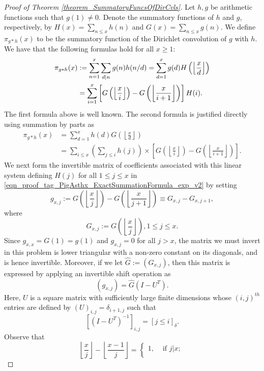 \documentclass[11pt,reqno,a4letter]{article}
\numberwithin{figure}{section}
\numberwithin{table}{section}
\newcommand{\Iverson}[1]{\ensuremath{\left[#1\right]_{\delta}}}
\newcommand{\floor}[1]{\left\lfloor #1 \right\rfloor}
\newcommand{\Floor}[2]{\ensuremath{\left\lfloor \frac{#1}{#2} \right\rfloor}}
\theoremstyle{plain}
\numberwithin{theorem}{section}
\theoremstyle{definition}
\begin{document}
\begin{proof}[Proof of Theorem \ref{theorem_SummatoryFuncsOfDirCvls}] 
\label{proofOf_theorem_SummatoryFuncsOfDirCvls} 
Let $h,g$ be arithmetic functions such that $g(1) \neq 0$. 
Denote the summatory functions of $h$ and $g$, 
respectively, by $H(x) = \sum_{n \leq x} h(n)$ and $G(x) = \sum_{n \leq x} g(n)$. 
We define $\pi_{g \ast h}(x)$ to be the summatory function of the 
Dirichlet convolution of $g$ with $h$. 
We have that the following formulas hold for all $x \geq 1$: 
\begin{align} 
\notag 
\pi_{g \ast h}(x) & := \sum_{n=1}^{x} \sum_{d|n} g(n) h(n/d) = \sum_{d=1}^x g(d) H\left(\floor{\frac{x}{d}}\right) \\ 
\label{eqn_proof_tag_PigAsthx_ExactSummationFormula_exp_v2} 
     & = \sum_{i=1}^x \left[G\left(\floor{\frac{x}{i}}\right) - G\left(\floor{\frac{x}{i+1}}\right)\right] H(i). 
\end{align} 
The first formula above is well known. The second formula is justified directly using 
summation by parts as \cite[\S 2.10(ii)]{NISTHB} 
\begin{align*} 
\pi_{g \ast h}(x) & = \sum_{d=1}^x h(d) G\left(\floor{\frac{x}{d}}\right) \\ 
     & = \sum_{i \leq x} \left(\sum_{j \leq i} h(j)\right) \times 
     \left[G\left(\floor{\frac{x}{i}}\right) - 
     G\left(\floor{\frac{x}{i+1}}\right)\right]. 
\end{align*} 
We next form the invertible matrix of coefficients associated with this linear system defining $H(j)$ for all 
$1 \leq j \leq x$ in \eqref{eqn_proof_tag_PigAsthx_ExactSummationFormula_exp_v2} by setting 
\[
g_{x,j} := G\left(\floor{\frac{x}{j}}\right) - G\left(\floor{\frac{x}{j+1}}\right) \equiv G_{x,j} - G_{x,j+1}, 
\] 
where 
\[
G_{x,j} := G\left(\Floor{x}{j}\right), 1 \leq j \leq x. 
\]
Since $g_{x,x} = G(1) = g(1)$ and $g_{x,j} = 0$ for all $j > x$, 
the matrix we must invert in this problem is lower triangular with a non-zero 
constant on its diagonals, and is hence invertible. 
Moreover, if we let $\hat{G} := (G_{x,j})$, then this matrix is 
expressed by applying an invertible shift operation as 
\[
(g_{x,j}) = \hat{G} (I - U^{T}). 
\]
Here, $U$ is a square matrix with sufficiently large finite dimensions 
whose $(i,j)^{th}$ entries are defined by $(U)_{i,j} = \delta_{i+1,j}$ such that 
\[
\left[(I - U^T)^{-1}\right]_{i,j} = \Iverson{j \leq i}. 
\]
Observe that 
\[
\Floor{x}{j} - \Floor{x-1}{j} = \begin{cases} 
     1, & \text{ if $j|x$; } \\ 

\end{cases}\]
\end{proof}
\end{document}
